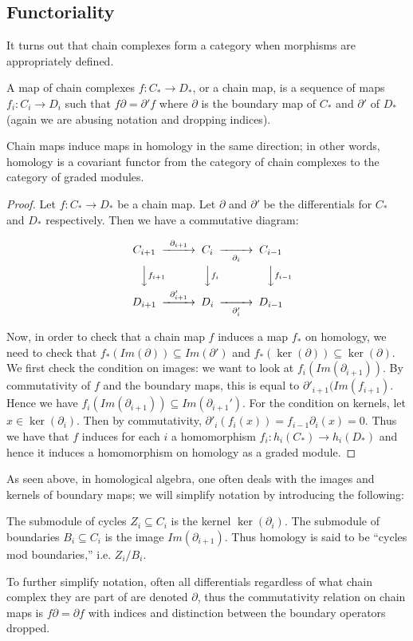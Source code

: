 \subsection{Functoriality}
It turns out that chain complexes form a category when morphisms
are appropriately defined.
\begin{definition} A map of chain complexes $f:C_*\rightarrow
D_*$, or a chain map, is a sequence of maps $f_i:C_i\rightarrow
D_i$ such that $f\partial = \partial' f$ where $\partial$ is the
boundary map of $C_*$ and $\partial'$ of $D_*$ (again we are
abusing notation and dropping indices). \end{definition}
\begin{theorem} Chain maps induce maps in homology in the same
direction; in other words, homology is a covariant functor from
the category of chain complexes to the category of graded
modules.\end{theorem}
\begin{proof}
Let $f:C_*\rightarrow D_*$ be a chain map. Let $\partial$ and
$\partial'$ be the differentials for $C_*$ and $D_*$
respectively. Then we have a commutative diagram:

\begin{equation}
\begin{CD}
C_{i+1} @>\partial_{i+1}>> C_i @>>\partial_i> C_{i-1}\\
@VV f_{i+1} V          @VV f_i V             @VVf_{i-1} V\\
D_{i+1} @>\partial'_{i+1}>> D_i @>>\partial'_i> D_{i-1}
\end{CD}
\end{equation}

Now, in order to check that a chain map $f$ induces a map $f_*$
on homology, we need to check that $f_*(Im(\partial))\subseteq
Im(\partial')$ and $f_*(\ker(\partial))\subseteq
\ker(\partial)$. We first check the condition on images: we want
to look at $f_i(Im(\partial_{i+1}))$. By commutativity of $f$
and the boundary maps, this is equal to
$\partial'_{i+1}(Im(f_{i+1})$. Hence we have
$f_i(Im(\partial_{i+1}))\subseteq Im(\partial_{i+1}')$. For the
condition on kernels, let $x\in \ker(\partial_i)$. Then by
commutativity, $\partial'_i(f_i(x))=f_{i-1}\partial_i(x)=0$.
Thus we have that $f$ induces for each $i$ a homomorphism
$f_i:h_i(C_*)\rightarrow h_i(D_*)$ and hence it induces a
homomorphism on homology as a graded module. \end{proof}

As seen above, in homological algebra, one often deals with the
images and kernels of boundary maps; we will simplify notation
by introducing the following:
\begin{definition} The submodule of cycles $Z_i\subseteq C_i$ is
the kernel $\ker(\partial_i)$. The submodule of boundaries
$B_i\subseteq C_i$ is the image $Im(\partial_{i+1})$. Thus
homology is said to be ``cycles mod boundaries,'' i.e.
$Z_i/B_i$.\end{definition}
To further simplify notation, often all differentials regardless
of what chain complex they are part of are denoted $\partial$,
thus the commutativity relation on chain maps is
$f\partial=\partial f$ with indices and distinction between the
boundary operators dropped.

